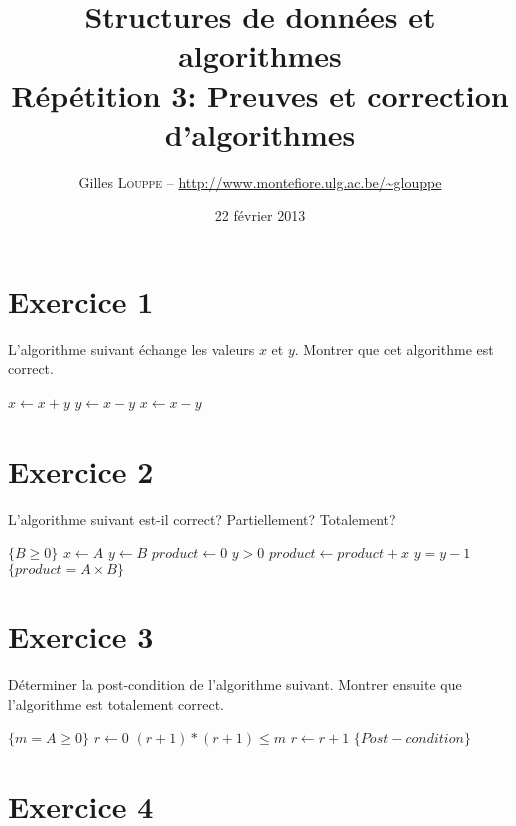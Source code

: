 \documentclass[a4paper,10pt]{article}
\title{
    \textbf{Structures de données et algorithmes}\\
    Répétition 3: Preuves et correction d'algorithmes
}
\author{Gilles \textsc{Louppe} -- \url{http://www.montefiore.ulg.ac.be/~glouppe}}
\date{22 février 2013}
\begin{document}
\maketitle

\section*{Exercice 1}

L'algorithme suivant échange les valeurs $x$ et $y$. Montrer que cet algorithme est correct.

\begin{codebox}
    \li $x\gets x + y$
    \li $y\gets x - y$
    \li $x\gets x - y$
\end{codebox}
\vspace{10pt}

\section*{Exercice 2}

L'algorithme suivant est-il correct? Partiellement? Totalement?

\begin{codebox}
    \li \Comment $\{B \geq 0\}$
    \li $x\gets A$
    \li $y\gets B$
    \li $product\gets 0$
    \li \While $y > 0$
    \li \Do     $product\gets product + x$
    \li         $y = y - 1$
        \End
    \li \Comment $\{product = A \times B\}$
    \End
\end{codebox}
\vspace{10pt}

\section*{Exercice 3}

Déterminer la post-condition de l'algorithme suivant. Montrer ensuite que l'algorithme est totalement correct.

\begin{codebox}
    \li \Comment $\{m = A \geq 0\}$
    \li $r\gets 0$
    \li \While $(r+1)*(r+1)\leq m$
    \li \Do     $r\gets r+1$
        \End
    \li \Comment $\{Post-condition\}$
    \End
\end{codebox}
\vspace{10pt}

\section*{Exercice 4}
\end{document}

